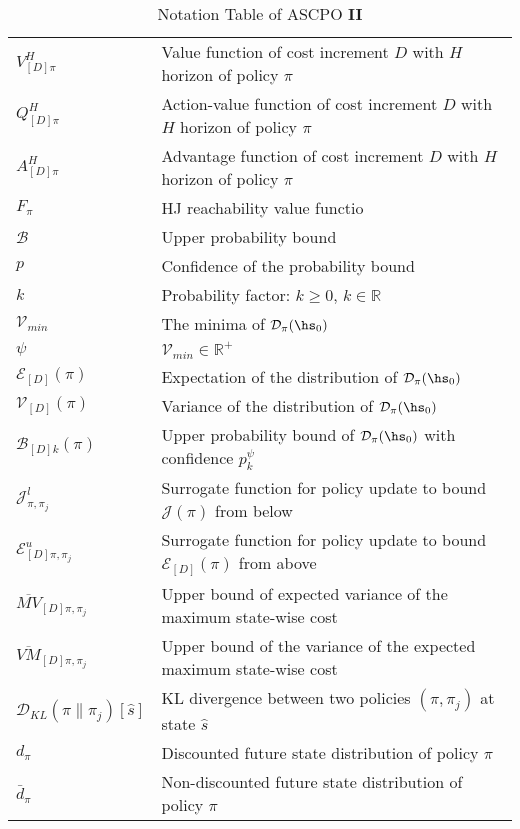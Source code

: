 \begin{table}[H]
    \centering
    \caption{Notation Table of ASCPO \textbf{II}}
    \begin{tabular}{p{2cm} p{13cm}}
        \toprule
        $V^H_{[D]\pi}$ & Value function of cost increment $D$ with $H$ horizon of policy $\pi$\\
        $Q^H_{[D]\pi}$ & Action-value function of cost increment $D$ with $H$ horizon of policy $\pi$\\
        $A^H_{[D]\pi}$ & Advantage function of cost increment $D$ with $H$ horizon of policy $\pi$\\
        $F_\pi$ & HJ reachability value functio\\
        $\mathcal{B}$ & Upper probability bound\\
        ${p}$ & Confidence of the probability bound\\
        $k$ & Probability factor: $k \geq 0$, $k \in \mathbb{R}$\\
        $\mathcal{V}_{min}$ & The minima of $\mathcal{D}_{\pi}(\hs_0)$\\
        $\psi$ & $\mathcal{V}_{min} \in \mathbb{R}^+$ \\
        $\mathcal{E}_{[D]}(\pi)$ & Expectation of the distribution of $\mathcal{D}_{\pi}(\hs_0)$\\
        $\mathcal{V}_{[D]}(\pi)$ & Variance of the distribution of $\mathcal{D}_{\pi}(\hs_0)$\\
        $\mathcal{B}_{[D]k}(\pi)$ & Upper probability bound of $\mathcal{D}_{\pi}(\hs_0)$ with confidence $p_k^\psi$\\
        $\mathcal{J}^l_{\pi, \pi_j}$ & Surrogate function for policy update to bound $\mathcal{J}(\pi)$ from below \\
        $\mathcal{E}^{u}_{[D]\pi, \pi_j}$ & Surrogate function for policy update to bound $\mathcal{E}_{[D]}(\pi)$ from above \\
        $\overline{MV}_{[D]\pi,\pi_j}$ & Upper bound of expected variance of the maximum state-wise cost\\
        $\overline{VM}_{[D]\pi,\pi_j}$ & Upper bound of the variance of the expected maximum state-wise cost \\
        $\mathcal{D}_{KL}(\pi \| \pi_j)[{\hat s}]$ & KL divergence between two policies $(\pi, \pi_j)$ at state $\hat s$\\
        $d_{\pi}$ & Discounted future state distribution of policy $\pi$ \\
        $\bar d_{\pi}$ & Non-discounted future state distribution of policy $\pi$ \\

\end{tabular}
\end{table}
